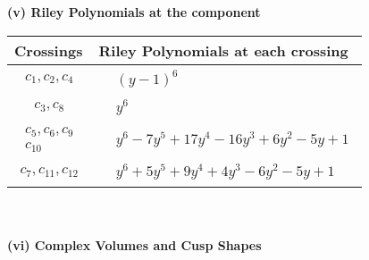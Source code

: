 \documentclass[1p]{elsarticle_modified}
\theoremstyle{definition}
\begin{document}
\newpage\renewcommand{\arraystretch}{1}
\flushleft \textbf{(v) Riley Polynomials at the component}\newline \\
\begin{tabular}{m{50pt}|m{274pt}}
Crossings & \hspace{64pt}Riley Polynomials at each crossing \\
\hline $$\begin{aligned}c_{1},c_{2},c_{4}\end{aligned}$$&$\begin{aligned}
&(y-1)^6
\end{aligned}$\\
\hline $$\begin{aligned}c_{3},c_{8}\end{aligned}$$&$\begin{aligned}
&y^6
\end{aligned}$\\
\hline $$\begin{aligned}c_{5},c_{6},c_{9}\\c_{10}\end{aligned}$$&$\begin{aligned}
&y^6-7 y^5+17 y^4-16 y^3+6 y^2-5 y+1
\end{aligned}$\\
\hline $$\begin{aligned}c_{7},c_{11},c_{12}\end{aligned}$$&$\begin{aligned}
&y^6+5 y^5+9 y^4+4 y^3-6 y^2-5 y+1
\end{aligned}$\\
\hline
\end{tabular}\\~\\
\newpage\flushleft \textbf{(vi) Complex Volumes and Cusp Shapes}
\end{document}
